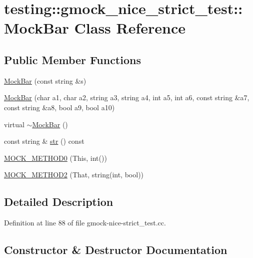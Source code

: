\hypertarget{classtesting_1_1gmock__nice__strict__test_1_1_mock_bar}{}\section{testing\+:\+:gmock\+\_\+nice\+\_\+strict\+\_\+test\+:\+:Mock\+Bar Class Reference}
\label{classtesting_1_1gmock__nice__strict__test_1_1_mock_bar}
\subsection*{Public Member Functions}
\begin{DoxyCompactItemize}
\item 
\hyperlink{classtesting_1_1gmock__nice__strict__test_1_1_mock_bar_a3b271f736d0b519777af26e7ac76d442}{Mock\+Bar} (const string \&s)
\item 
\hyperlink{classtesting_1_1gmock__nice__strict__test_1_1_mock_bar_a2f30bd760cd5b5a8de72d081b26df5b9}{Mock\+Bar} (char a1, char a2, string a3, string a4, int a5, int a6, const string \&a7, const string \&a8, bool a9, bool a10)
\item 
virtual \hyperlink{classtesting_1_1gmock__nice__strict__test_1_1_mock_bar_a0559a3ecd9ecb4eebd5f519bf96bf03b}{$\sim$\+Mock\+Bar} ()
\item 
const string \& \hyperlink{classtesting_1_1gmock__nice__strict__test_1_1_mock_bar_a044acf03b010d355430c9d61949857cb}{str} () const 
\item 
\hyperlink{classtesting_1_1gmock__nice__strict__test_1_1_mock_bar_a9aad688c2b1dc6b529b7c499e49e3a70}{M\+O\+C\+K\+\_\+\+M\+E\+T\+H\+O\+D0} (This, int())
\item 
\hyperlink{classtesting_1_1gmock__nice__strict__test_1_1_mock_bar_ac2c649c788feae66d3b4a9249720ae5b}{M\+O\+C\+K\+\_\+\+M\+E\+T\+H\+O\+D2} (That, string(int, bool))
\end{DoxyCompactItemize}


\subsection{Detailed Description}


Definition at line 88 of file gmock-\/nice-\/strict\+\_\+test.\+cc.



\subsection{Constructor \& Destructor Documentation}
